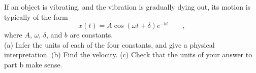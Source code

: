 If an object is vibrating, and the vibration is gradually dying out,
its motion is typically of the form
\begin{equation*}
  x(t) = A\cos(\omega t+\delta)e^{-bt} \qquad ,
\end{equation*}
where $A$, $\omega$, $\delta$, and $b$ are constants.\\
(a) Infer the units of each of the four constants, and give
a physical interpretation.\hwendpart
(b) Find the velocity.\hwendpart
(c) Check that the units of your answer to part b make sense.\answercheck\hwendpart
